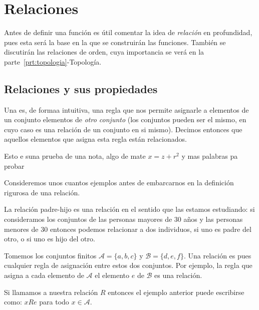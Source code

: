 \chapter{Relaciones}%
\label{cha:Relaciones}

\begin{primerpar}
	Antes de definir una función es útil
comentar la idea de \emph{relación} en profundidad, pues esta será
la base en la que se construirán las funciones. También se discutirán
las relaciones de orden, cuya importancia se verá en la parte~\ref{prt:topologia}-Topología.
\end{primerpar}

\section{Relaciones y sus propiedades}%
\label{sec:RelacionesPropiedades}


Una  es, de forma\textsf{a} intuitiva, una regla que nos permite
asignarle a elementos de un conjunto elementos de \emph{otro conjunto} (los conjuntos pueden ser el mismo, en cuyo caso es una relación de un conjunto en si mismo).
Decimos entonces que aquellos elementos que asigna esta regla están relacionados.

\begin{nota}
	Esto e suna prueba de una nota, algo de mate $x=z+r^2$ y mas palabras pa probar
\end{nota}

Consideremos unos cuantos ejemplos antes de embarcarnos en la definición rigurosa de
una relación.

\begin{ejem}
	La relación padre-hijo es una relación en el sentido que las estamos estudiando: si consideramos
	los conjuntos de las personas mayores de $30$ años y las personas menores de $30$ entonces
	podemos relacionar a dos individuos, si uno es padre del otro, o si uno es hijo del otro.
\end{ejem}

\begin{ejem}
	Tomemos los conjuntos finitos $\mathcal{A}=\{ a,b,c \}$ y $\mathcal{B}=\{ d,e,f \}$.
	Una relación es pues cualquier regla de asignación entre estos dos conjuntos. Por ejemplo, la regla
	que asigna a cada elemento de $\mathcal{A}$ el elemento $e$ de $\mathcal{B}$ es una relación.
\end{ejem}

Si llamamos a nuestra relación $R$ entonces el ejemplo anterior puede escribirse como: $xRe$ para todo $x\in\mathcal{A}$.

